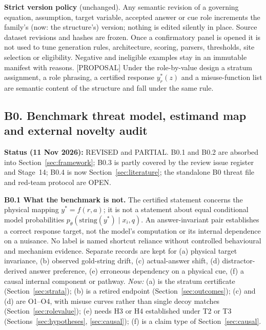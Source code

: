 \documentclass[10pt,a4paper]{article}
\newcommand{\tg}[1]{\textsc{[#1]}}
\begin{document}
\textbf{Strict version policy} (unchanged). Any semantic revision of a governing equation, assumption, target
variable, accepted answer or cue role increments the family's (now: the structure's) version; nothing is edited
silently in place. Source dataset revisions and hashes are frozen. Once a confirmatory panel is opened it is
not used to tune generation rules, architecture, scoring, parsers, thresholds, site selection or eligibility.
Negative and ineligible examples stay in an immutable manifest with reasons. \tg{PROPOSAL} Under the
role-by-value design a stratum assignment, a role phrasing, a certified response $y^*_r(z)$ and a misuse-function
list are semantic content of the structure and fall under the same rule.

\subsection{B0. Benchmark threat model, estimand map and external novelty audit}\label{sec:phaseB-B0}

\textbf{Status (11 Nov 2026):} REVISED and PARTIAL. B0.1 and B0.2 are absorbed into
Section~\ref{sec:framework}; B0.3 is partly covered by the review issue register and Stage~14; B0.4 is now
Section~\ref{sec:literature}; the standalone B0 threat file and red-team protocol are OPEN.

\textbf{B0.1 What the benchmark is not.} The certified statement concerns the physical mapping $y^*=f(r,a)$; it
is not a statement about equal conditional model probabilities $p_\theta(\mathrm{string}(y^*)\mid x_i,q)$. An
answer-invariant pair establishes a correct response target, not the model's computation or its internal
dependence on a nuisance. No label is named shortcut reliance without controlled behavioural and mechanism
evidence. Separate records are kept for (a) physical target invariance, (b) observed gold-string drift,
(c) actual-answer shift, (d) distractor-derived answer preference, (e) erroneous dependency on a physical cue,
(f) a causal internal component or pathway. \emph{Now:} (a) is the stratum certificate
(Section~\ref{sec:strata}); (b) is a retired endpoint (Section~\ref{sec:outcomes}); (c) and (d) are O1--O4, with
misuse curves rather than single decoy matches (Section~\ref{sec:rolevalue}); (e) needs H3 or H4 established under
T2 or T3 (Sections~\ref{sec:hypotheses}, \ref{sec:causal}); (f) is a claim type of Section~\ref{sec:causal}.
\end{document}
